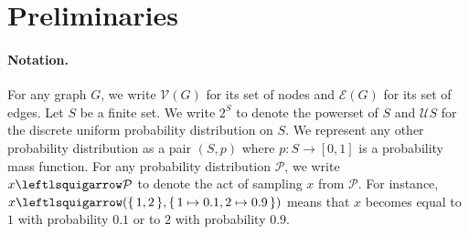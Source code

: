 \documentclass[runningheads]{llncs}
\begin{document}

\section{Preliminaries}\label{sec:prelims}


\paragraph{Notation.}
For any graph $G$, we write $\mathcal{V}(G)$ for its set of nodes and
$\mathcal{E}(G)$ for its set of edges. Let $S$ be a finite set. We write $2^{S}$
to denote the powerset of $S$ and $\mathcal{U}S$ for the discrete uniform
probability distribution on $S$. We represent any other probability distribution
as a pair $(S, p)$ where $p\colon S \to [0, 1]$ is a probability mass function.
For any probability distribution $\mathcal{P}$, we write
$x \leftlsquigarrow \mathcal{P}$ to denote the act of sampling $x$ from
$\mathcal{P}$. For instance,
$x \leftlsquigarrow (\{\, 1, 2 \,\}, \{\, 1 \mapsto 0.1, 2 \mapsto 0.9 \,\})$
means that $x$ becomes equal to $1$ with probability $0.1$ or to $2$ with
probability $0.9$.
\end{document}
